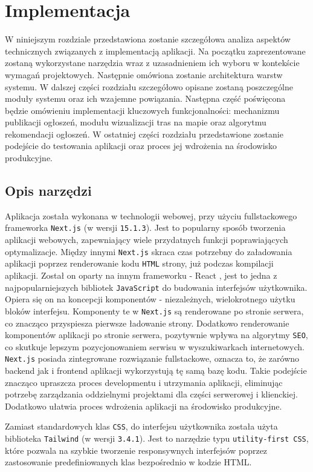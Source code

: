 \chapter{Implementacja}
W niniejszym rozdziale przedstawiona zostanie szczegółowa analiza aspektów technicznych związanych z implementacją aplikacji. Na początku zaprezentowane zostaną wykorzystane narzędzia wraz z uzasadnieniem ich wyboru w kontekście wymagań projektowych. Następnie omówiona zostanie architektura warstw systemu. W dalszej części rozdziału szczegółowo opisane zostaną poszczególne moduły systemu oraz ich wzajemne powiązania. Następna część poświęcona będzie omówieniu implementacji kluczowych funkcjonalności: mechanizmu publikacji ogłoszeń, modułu wizualizacji tras na mapie oraz algorytmu rekomendacji ogłoszeń. W ostatniej części rozdziału przedstawione zostanie podejście do testowania aplikacji oraz proces jej wdrożenia na środowisko produkcyjne.

\section{Opis narzędzi}
Aplikacja została wykonana w technologii webowej, przy użyciu fullstackowego frameworka \texttt{Next.js} \cite{Next} (w wersji \texttt{15.1.3}). Jest to popularny sposób tworzenia aplikacji webowych, zapewniający wiele przydatnych funkcji poprawiających optymalizacje. Między innymi \texttt{Next.js} skraca czas potrzebny do załadowania aplikacji poprzez renderowanie kodu \texttt{HTML} strony, już podczas kompilacji aplikacji. Został on oparty na innym frameworku - React \cite{React}, jest to jedna z najpopularniejszych bibliotek \texttt{JavaScript} do budowania interfejsów użytkownika. Opiera się on na koncepcji komponentów - niezależnych, wielokrotnego użytku bloków interfejsu. Komponenty te w  \texttt{Next.js} są renderowane po stronie serwera, co znacząco przyspiesza pierwsze ładowanie strony. Dodatkowo renderowanie komponentów aplikacji po stronie serwera, pozytywnie wpływa na algorytmy \texttt{SEO}, co skutkuje lepszym pozycjonowaniem serwisu w wyszukiwarkach internetowych. \texttt{Next.js} posiada zintegrowane rozwiązanie fullstackowe, oznacza to, że zarówno backend jak i frontend aplikacji wykorzystują tę samą bazę kodu. Takie podejście znacząco upraszcza proces developmentu i utrzymania aplikacji, eliminując potrzebę zarządzania oddzielnymi projektami dla części serwerowej i klienckiej. Dodatkowo ułatwia proces wdrożenia aplikacji na środowisko produkcyjne.

Zamiast standardowych klas \texttt{CSS}, do interfejsu użytkownika została użyta biblioteka \texttt{Tailwind} \cite{Tailwind} (w wersji \texttt{3.4.1}). Jest to narzędzie typu \texttt{utility-first CSS}, które pozwala na szybkie tworzenie responsywnych interfejsów poprzez zastosowanie predefiniowanych klas bezpośrednio w kodzie HTML.

